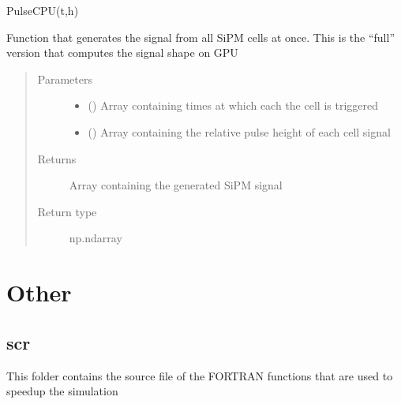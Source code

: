 \documentclass[letterpaper,10pt,english]{sphinxmanual}
\begin{document}
\begin{fulllineitems}
\label{\detokenize{structure:libs.libGPU.PulseGPU}}
PulseCPU(t,h)

Function that generates the signal from all SiPM cells at once. This is the “full” version that computes the signal shape on GPU
\begin{quote}\begin{description}
\item[{Parameters}] \leavevmode\begin{itemize}
\item {} 
 (\sphinxstyleliteralemphasis{\sphinxupquote{(}}\sphinxstyleliteralemphasis{\sphinxupquote{)}}) \textendash{} Array containing times at which each the cell is triggered

\item {} 
 (\sphinxstyleliteralemphasis{\sphinxupquote{(}}\sphinxstyleliteralemphasis{\sphinxupquote{)}}) \textendash{} Array containing the relative pulse height of each cell signal

\end{itemize}

\item[{Returns}] \leavevmode
{} \textendash{} Array containing the generated SiPM signal

\item[{Return type}] \leavevmode
np.ndarray

\end{description}\end{quote}

\end{fulllineitems}



\section{Other}
\label{\detokenize{structure:other}}

\subsection{scr}
\label{\detokenize{structure:scr}}
This folder contains the source file of the FORTRAN functions that are used to speed\sphinxhyphen{}up the simulation
\end{document}

